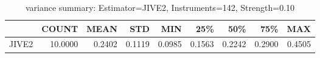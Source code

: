 \begin{table}[ht]
\centering
\caption{variance summary: Estimator=JIVE2, Instruments=142, Strength=0.10}
\begin{tabular}{lrrrrrrrr}
\toprule
 & COUNT & MEAN & STD & MIN & 25\% & 50\% & 75\% & MAX \\
\midrule
JIVE2 & 10.0000 & 0.2402 & 0.1119 & 0.0985 & 0.1563 & 0.2242 & 0.2900 & 0.4505 \\
\bottomrule
\end{tabular}
\end{table}
